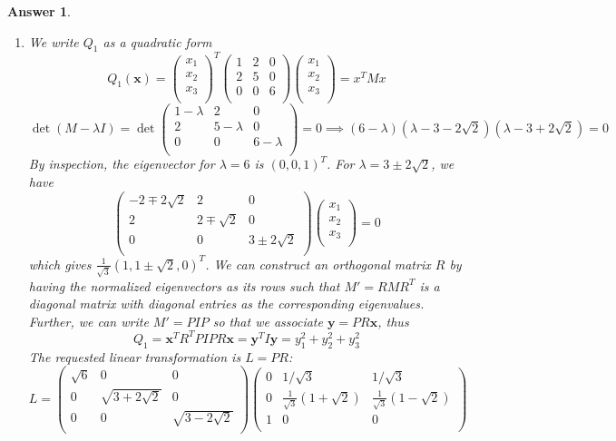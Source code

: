 \documentclass[a4paper]{article}
\newtheorem{ans}{Answer}[section]
\theoremstyle{new}
\begin{document}
\newpage
\begin{ans}\leavevmode
\begin{enumerate}[label=(\alph*)]
\item We write $Q_1$ as a quadratic form
$$Q_1(\mathbf{x})=\begin{pmatrix}x_1\\x_2\\x_3\\\end{pmatrix}^T\begin{pmatrix}1&2&0\\2&5&0\\0&0&6\\\end{pmatrix}\begin{pmatrix}x_1\\x_2\\x_3\\\end{pmatrix}=x^TMx$$
$$\det(M-\lambda I)=\det\begin{pmatrix}1-\lambda&2&0\\2&5-\lambda&0\\0&0&6-\lambda\\\end{pmatrix}=0\implies(6-\lambda)(\lambda-3-2\sqrt{2})(\lambda-3+2\sqrt{2})=0$$
By inspection, the eigenvector for $\lambda=6$ is $(0,0,1)^T$. For $\lambda=3\pm 2\sqrt{2}$, we have
$$\begin{pmatrix}-2\mp2\sqrt{2}&2&0\\2&2\mp\sqrt{2}&0\\0&0&3\pm2\sqrt{2}\\\end{pmatrix}\begin{pmatrix}x_1\\x_2\\x_3\\\end{pmatrix}=0$$
which gives $\frac{1}{\sqrt{3}}(1,1\pm\sqrt{2},0)^T$. We can construct an orthogonal matrix $R$ by having the normalized eigenvectors as its rows such that $M'=RMR^T$ is a diagonal matrix with diagonal entries as the corresponding eigenvalues. Further, we can write $M'=PIP$ so that we associate $\mathbf{y}=PR\mathbf{x}$, thus
$$Q_1=\mathbf{x}^TR^TPIPR\mathbf{x}=\mathbf{y}^TI\mathbf{y}=y_1^2+y_2^2+y_3^2$$
The requested linear transformation is $L=PR$:
$$L=\begin{pmatrix}\sqrt{6}&0&0\\0&\sqrt{3+2\sqrt{2}}&0\\0&0&\sqrt{3-2\sqrt{2}}\\\end{pmatrix}\begin{pmatrix}0&1/\sqrt{3}&1/\sqrt{3}\\0&\frac{1}{\sqrt{3}}(1+\sqrt{2})&\frac{1}{\sqrt{3}}(1-\sqrt{2})\\1&0&0\\\end{pmatrix}$$

\end{enumerate}
\end{ans}
\end{document}
